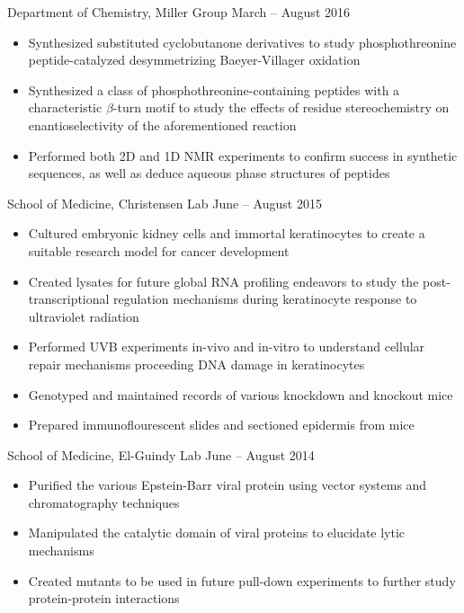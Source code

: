 \documentclass[10pt]{res} %
\begin{document}
\begin{resume}
\begin{itemize}
\end{itemize}

\vspace{-6pt} %
Department of Chemistry, Miller Group \hfill March -- August 2016 
\begin{itemize} \itemsep -2pt %
\item Synthesized substituted cyclobutanone derivatives to study phosphothreonine peptide-catalyzed desymmetrizing Baeyer-Villager oxidation
\item Synthesized a class of phosphothreonine-containing peptides with a characteristic $\beta$-turn motif to study the effects of residue stereochemistry on enantioselectivity of the aforementioned reaction
\item Performed both 2D and 1D NMR experiments to confirm success in synthetic sequences, as well as deduce aqueous phase structures of peptides
\end{itemize}

\vspace{-6pt} %
School of Medicine, Christensen Lab \hfill June -- August 2015 
\begin{itemize} \itemsep -2pt %
\item Cultured embryonic kidney cells and immortal keratinocytes to create a suitable research model for cancer development
\item Created lysates for future global RNA profiling endeavors to study the post-transcriptional regulation mechanisms during keratinocyte response to ultraviolet radiation
\item Performed UVB experiments in-vivo and in-vitro to understand cellular repair mechanisms proceeding DNA damage in keratinocytes
\item Genotyped and maintained records of various knockdown and knockout mice 
\item Prepared immunoflourescent slides and sectioned epidermis from mice
\end{itemize}

\vspace{-6pt} %
School of Medicine, El-Guindy Lab \hfill June -- August 2014 
\begin{itemize} \itemsep -2pt %
\item Purified the various Epstein-Barr viral protein using vector systems and chromatography techniques
\item Manipulated the catalytic domain of viral proteins to elucidate lytic mechanisms
\item Created mutants to be used in future pull-down experiments to further study protein-protein interactions
\end{itemize}


\end{resume}
\end{document}
